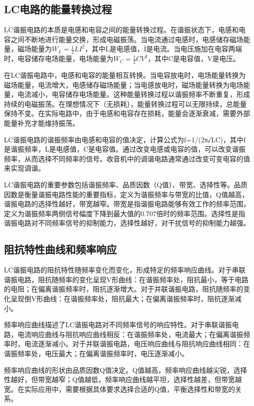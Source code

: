 \documentclass[12pt,UTF8]{ctexbook}
\begin{document}
\subsection{LC电路的能量转换过程}

LC谐振电路的本质是电感和电容之间的能量转换过程。在谐振状态下，电感和电容之间不断地进行能量交换，形成电磁振荡。当电流通过电感时，电感储存磁场能量，磁场能量为$W_L = \frac{1}{2}LI^2$，其中L是电感值，I是电流。当电压施加在电容两端时，电容储存电场能量，电场能量为$W_C = \frac{1}{2}CV^2$，其中C是电容值，V是电压。

在LC谐振电路中，电感和电容的能量相互转换。当电容放电时，电场能量转换为磁场能量，电流增大，电感储存磁场能量；当电感放电时，磁场能量转换为电场能量，电流减小，电容储存电场能量。这种能量转换过程以谐振频率不断重复，形成持续的电磁振荡。在理想情况下（无损耗），能量转换过程可以无限持续，总能量保持不变。在实际电路中，由于电感和电容存在损耗，能量会逐渐衰减，需要外部能量补充才能维持振荡。

LC谐振电路的谐振频率由电感和电容的值决定，计算公式为f=1/(2π√LC)，其中f是谐振频率，L是电感值，C是电容值。通过改变电感或电容的值，可以改变谐振频率，从而选择不同频率的信号。收音机中的调谐电路通常通过改变可变电容的值来实现调谐。

LC谐振电路的重要参数包括谐振频率、品质因数（Q值）、带宽、选择性等。品质因数是衡量谐振电路性能的重要指标，定义为谐振频率与带宽的比值，Q值越高，谐振电路的选择性越好，带宽越窄。带宽是指谐振电路能够有效工作的频率范围，定义为谐振频率两侧信号幅度下降到最大值的0.707倍时的频率范围。选择性是指谐振电路对不同频率信号的抑制能力，选择性越好，对干扰信号的抑制能力越强。

\subsection{阻抗特性曲线和频率响应}

LC谐振电路的阻抗特性随频率变化而变化，形成特定的频率响应曲线。对于串联谐振电路，阻抗随频率的变化呈现V形曲线：在谐振频率处，阻抗最小，等于电路的电阻；在偏离谐振频率时，阻抗逐渐增大。对于并联谐振电路，阻抗随频率的变化呈现倒V形曲线：在谐振频率处，阻抗最大；在偏离谐振频率时，阻抗逐渐减小。

频率响应曲线描述了LC谐振电路对不同频率信号的响应特性。对于串联谐振电路，电流响应曲线与阻抗响应曲线相反：在谐振频率处，电流最大；在偏离谐振频率时，电流逐渐减小。对于并联谐振电路，电压响应曲线与阻抗响应曲线相同：在谐振频率处，电压最大；在偏离谐振频率时，电压逐渐减小。

频率响应曲线的形状由品质因数Q值决定。Q值越高，频率响应曲线越尖锐，选择性越好，但带宽越窄；Q值越低，频率响应曲线越平坦，选择性越差，但带宽越宽。在实际应用中，需要根据具体要求选择合适的Q值，平衡选择性和带宽的关系。
\end{document}
